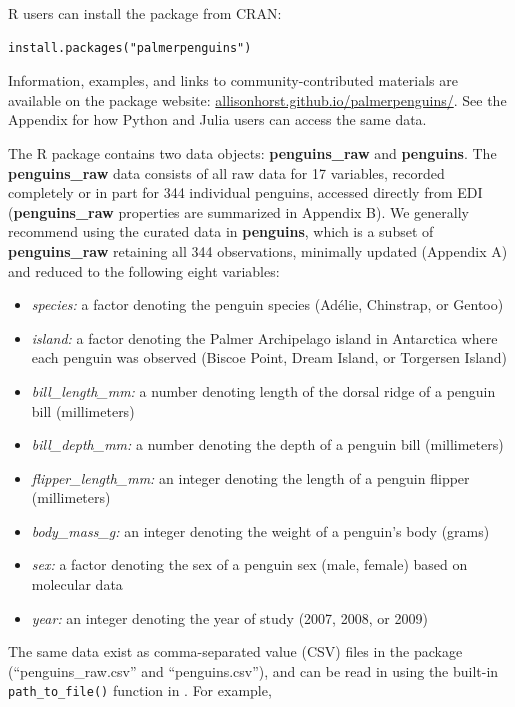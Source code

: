 R users can install the  package from CRAN:

\begin{verbatim}
install.packages("palmerpenguins")
\end{verbatim}

Information, examples, and links to community-contributed materials are
available on the  package website:
\href{https://allisonhorst.github.io/palmerpenguins/}{allisonhorst.github.io/palmerpenguins/}.
See the Appendix for how Python and Julia users can access the same
data.

The  R package contains two data objects:
\textbf{penguins\_raw} and \textbf{penguins}. The \textbf{penguins\_raw}
data consists of all raw data for 17 variables, recorded completely or
in part for 344 individual penguins, accessed directly from EDI
(\textbf{penguins\_raw} properties are summarized in Appendix B). We
generally recommend using the curated data in \textbf{penguins}, which
is a subset of \textbf{penguins\_raw} retaining all 344 observations,
minimally updated (Appendix A) and reduced to the following eight
variables:

\begin{itemize}
\tightlist
\item
  \emph{species:} a factor denoting the penguin species (Adélie,
  Chinstrap, or Gentoo)
\item
  \emph{island:} a factor denoting the Palmer Archipelago island in
  Antarctica where each penguin was observed (Biscoe Point, Dream
  Island, or Torgersen Island)
\item
  \emph{bill\_length\_mm:} a number denoting length of the dorsal ridge
  of a penguin bill (millimeters)
\item
  \emph{bill\_depth\_mm:} a number denoting the depth of a penguin bill
  (millimeters)
\item
  \emph{flipper\_length\_mm:} an integer denoting the length of a
  penguin flipper (millimeters)
\item
  \emph{body\_mass\_g:} an integer denoting the weight of a penguin's
  body (grams)
\item
  \emph{sex:} a factor denoting the sex of a penguin sex (male, female)
  based on molecular data
\item
  \emph{year:} an integer denoting the year of study (2007, 2008, or
  2009)
\end{itemize}

The same data exist as comma-separated value (CSV) files in the package
(``penguins\_raw.csv'' and ``penguins.csv''), and can be read in using
the built-in \texttt{path\_to\_file()} function in
. For example,

